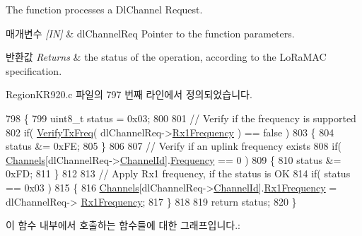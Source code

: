 The function processes a Dl\+Channel Request. 


\begin{DoxyParams}{매개변수}
{\em \mbox{[}\+I\+N\mbox{]}} & dl\+Channel\+Req Pointer to the function parameters.\\
\hline
\end{DoxyParams}

\begin{DoxyRetVals}{반환값}
{\em Returns} & the status of the operation, according to the Lo\+Ra\+M\+AC specification. \\
\hline
\end{DoxyRetVals}


Region\+K\+R920.\+c 파일의 797 번째 라인에서 정의되었습니다.


\begin{DoxyCode}
798 \{
799     uint8\_t status = 0x03;
800 
801     \textcolor{comment}{// Verify if the frequency is supported}
802     \textcolor{keywordflow}{if}( \mbox{\hyperlink{_region_k_r920_8c_af6b3cfa164d4105815aaaa55f02d723e}{VerifyTxFreq}}( dlChannelReq->\mbox{\hyperlink{structs_dl_channel_req_params_a8a564b8635b12d5f0f348ae177dd92e1}{Rx1Frequency}} ) == \textcolor{keyword}{false} )
803     \{
804         status &= 0xFE;
805     \}
806 
807     \textcolor{comment}{// Verify if an uplink frequency exists}
808     \textcolor{keywordflow}{if}( \mbox{\hyperlink{_region_k_r920_8c_aa22cc2ed5f1e155ccf4f0c0388da513e}{Channels}}[dlChannelReq->\mbox{\hyperlink{structs_dl_channel_req_params_ae23f953dc29c360e56a3c856404a3276}{ChannelId}}].\mbox{\hyperlink{structs_channel_params_ade3d190636488dad9a89b19446b7acf1}{Frequency}} == 0 )
809     \{
810         status &= 0xFD;
811     \}
812 
813     \textcolor{comment}{// Apply Rx1 frequency, if the status is OK}
814     \textcolor{keywordflow}{if}( status == 0x03 )
815     \{
816         \mbox{\hyperlink{_region_k_r920_8c_aa22cc2ed5f1e155ccf4f0c0388da513e}{Channels}}[dlChannelReq->\mbox{\hyperlink{structs_dl_channel_req_params_ae23f953dc29c360e56a3c856404a3276}{ChannelId}}].\mbox{\hyperlink{structs_channel_params_a8a564b8635b12d5f0f348ae177dd92e1}{Rx1Frequency}} = dlChannelReq->
      \mbox{\hyperlink{structs_dl_channel_req_params_a8a564b8635b12d5f0f348ae177dd92e1}{Rx1Frequency}};
817     \}
818 
819     \textcolor{keywordflow}{return} status;
820 \}
\end{DoxyCode}
이 함수 내부에서 호출하는 함수들에 대한 그래프입니다.\+:
\mbox{\label{group___r_e_g_i_o_n_k_r920_ga108b8547f585d92dd1198c18fc262fa2}} 
